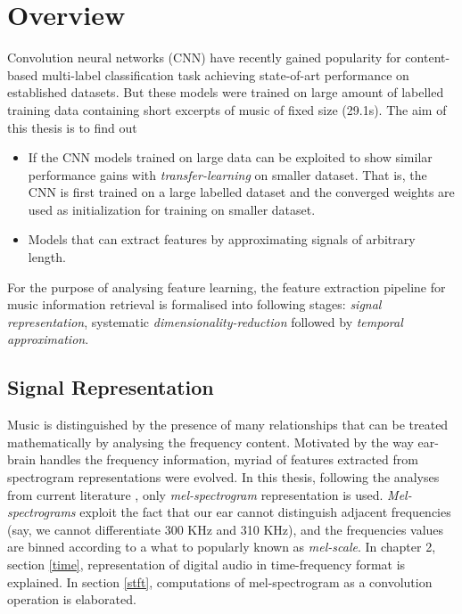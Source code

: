 \section{Overview}
\label{overview}
Convolution neural networks (CNN) have recently gained popularity for content-based multi-label classification task achieving state-of-art performance\cite{choi_cnn}\cite{choi_crnn} on established datasets\cite{MSD}\cite{MTT}. But these models were trained on large amount of labelled training data containing short excerpts of music of fixed size (29.1s). The aim of this thesis is to find out
\begin{itemize}
\setlength\itemsep{0em}
\item If the CNN models trained on large data can be exploited to show similar performance gains with \textit{transfer-learning} on smaller dataset. That is, the CNN is first trained on a large labelled dataset and the converged weights are used as initialization for training on smaller dataset. 
\item Models that can extract features by approximating signals of arbitrary length.
\end{itemize} 
    
\noindent For the purpose of analysing feature learning, the feature extraction pipeline for music information retrieval is formalised into following stages: \textit{signal representation}, systematic \textit{dimensionality-reduction} followed by \textit{temporal approximation}.
  
\subsection{Signal Representation}
Music is distinguished by the presence of many relationships that can be treated mathematically by analysing the frequency content. Motivated by the way ear-brain handles the frequency information, myriad of features extracted from spectrogram representations were evolved. In this thesis, following the analyses from current literature \cite{choi_cnn}\cite{EndToEnd}\cite{MultiScale}\cite{choi_crnn}, only \textit{mel-spectrogram} representation is used. \textit{Mel-spectrograms} exploit the fact that our ear cannot distinguish adjacent frequencies (say, we cannot differentiate 300 KHz and 310 KHz), and the frequencies values are binned according to a what to popularly known as \textit{mel-scale}. In chapter 2, section \ref{time}, representation of digital audio in time-frequency format is explained. In section \ref{stft}, computations of mel-spectrogram as a convolution operation is elaborated.
   
